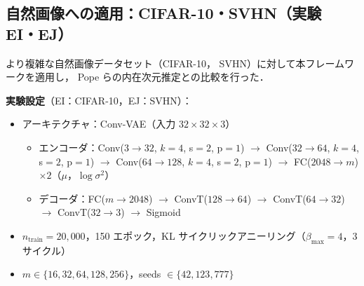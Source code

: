 \documentclass[11pt,a4paper]{jsarticle}
\begin{document}
\subsection{自然画像への適用：CIFAR-10・SVHN（実験 EI・EJ）}\label{sec:exp_natural}

より複雑な自然画像データセット（CIFAR-10\cite{krizhevsky2009learning}，
SVHN\cite{netzer2011reading}）に対して本フレームワークを適用し，
Pope ら\cite{pope2021intrinsic}の内在次元推定との比較を行った．

\textbf{実験設定}（EI：CIFAR-10，EJ：SVHN）：
\begin{itemize}
  \item アーキテクチャ：Conv-VAE（入力 $32 \times 32 \times 3$）
        \begin{itemize}
          \item エンコーダ：Conv($3\to32$, $k=4$, s$=2$, p$=1$) $\to$ Conv($32\to64$, $k=4$, s$=2$, p$=1$) $\to$
                Conv($64\to128$, $k=4$, s$=2$, p$=1$) $\to$ FC($2048 \to m$) $\times 2$（$\mu$，$\log\sigma^2$）
          \item デコーダ：FC($m \to 2048$) $\to$ ConvT($128\to64$) $\to$ ConvT($64\to32$) $\to$ ConvT($32\to3$) $\to$ Sigmoid
        \end{itemize}
  \item $n_{\mathrm{train}} = 20{,}000$，150 エポック，KL サイクリックアニーリング（$\beta_{\max}=4$，3サイクル）
  \item $m \in \{16, 32, 64, 128, 256\}$，seeds $\in \{42, 123, 777\}$
\end{itemize}
\end{document}
